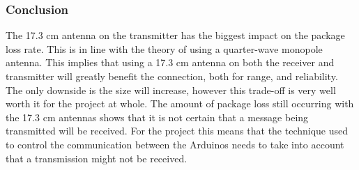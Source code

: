 \newpage
\subsubsection*{Conclusion}
The 17.3 cm antenna on the transmitter has the biggest impact on the package loss rate.
This is in line with the theory of using a quarter-wave monopole antenna.
This implies that using a 17.3 cm antenna on both the receiver and transmitter will greatly benefit the connection, both for range, and reliability.
The only downside is the size will increase, however this trade-off is very well worth it for the project at whole.
The amount of package loss still occurring with the 17.3 cm antennas shows that it is not certain that a message being transmitted will be received.
For the project this means that the technique used to control the communication between the Arduinos needs to take into account that a transmission might not be received.
